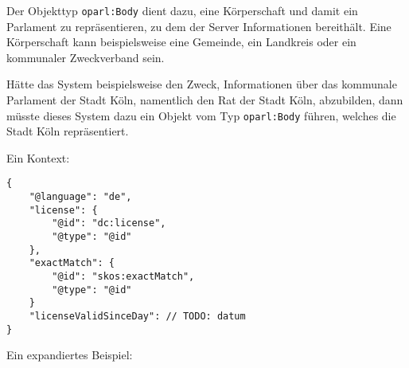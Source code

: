 \documentclass[,a4paper]{article}
\begin{document}
Der Objekttyp \texttt{oparl:Body} dient dazu, eine Körperschaft und
damit ein Parlament zu repräsentieren, zu dem der Server Informationen
bereithält. Eine Körperschaft kann beispielsweise eine Gemeinde, ein
Landkreis oder ein kommunaler Zweckverband sein.

Hätte das System beispielsweise den Zweck, Informationen über das
kommunale Parlament der Stadt Köln, namentlich den Rat der Stadt Köln,
abzubilden, dann müsste dieses System dazu ein Objekt vom Typ
\texttt{oparl:Body} führen, welches die Stadt Köln repräsentiert.

Ein Kontext:

\begin{verbatim}
{
    "@language": "de",
    "license": {
        "@id": "dc:license",
        "@type": "@id"
    },
    "exactMatch": {
        "@id": "skos:exactMatch",
        "@type": "@id"
    }
    "licenseValidSinceDay": // TODO: datum
}
\end{verbatim}

Ein expandiertes Beispiel:
\end{document}
